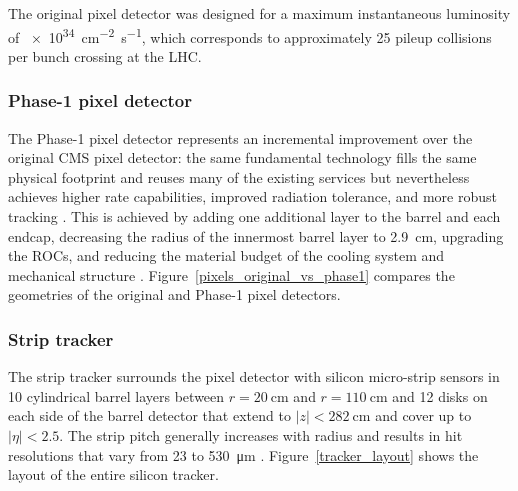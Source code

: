 The original pixel detector was designed for a maximum instantaneous luminosity of \SI{e34}{\cm\tothe{-2}\s\tothe{-1}}, which corresponds to approximately 25 pileup collisions per bunch crossing at the LHC.


\subsubsection{Phase-1 pixel detector}
The Phase-1 pixel detector represents an incremental improvement over the original CMS pixel detector: the same fundamental technology fills the same physical footprint and reuses many of the existing services but nevertheless achieves higher rate capabilities, improved radiation tolerance, and more robust tracking \cite{cms_phase1_pixels}. This is achieved by adding one additional layer to the barrel and each endcap, decreasing the radius of the innermost barrel layer to \SI{2.9}{\cm}, upgrading the ROCs, and reducing the material budget of the cooling system and mechanical structure \cite{cms_phase1_pixels, cms_phase1_pixel_tdr}. Figure~\ref{pixels_original_vs_phase1} compares the geometries of the original and Phase-1 pixel detectors.


\subsubsection{Strip tracker}
The strip tracker surrounds the pixel detector with silicon micro-strip sensors in 10 cylindrical barrel layers between $r=\SI{20}{\cm}$ and $r=\SI{110}{\cm}$ and 12 disks on each side of the barrel detector that extend to $|z|<\SI{282}{\cm}$ and cover up to $|\eta|<2.5$. The strip pitch generally increases with radius and results in hit resolutions that vary from \num{23} to \SI{530}{\um} \cite{cms_experiment}. Figure~\ref{tracker_layout} shows the layout of the entire silicon tracker.





